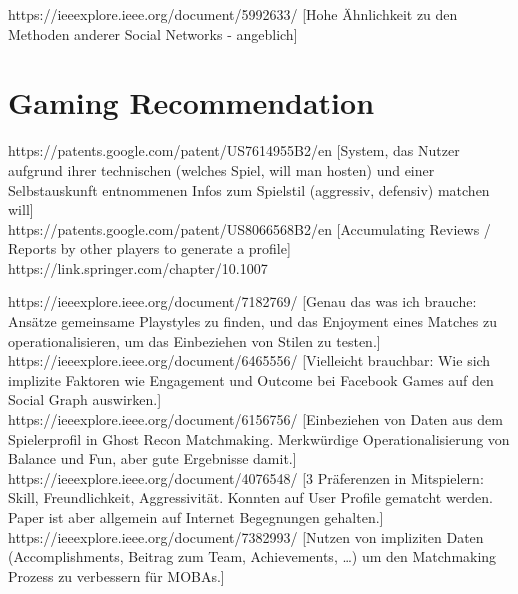 \documentclass[nochapterpage,bigchapter,linedtoc,longdoc,colorback,accentcolor=tud3b,oneside]{tudreport}
\begin{document}
https://ieeexplore.ieee.org/document/5992633/ [Hohe Ähnlichkeit zu den Methoden anderer Social Networks - angeblich]\\

\section{Gaming Recommendation}
https://patents.google.com/patent/US7614955B2/en [System, das Nutzer aufgrund ihrer technischen (welches Spiel, will man hosten) und einer Selbstauskunft entnommenen Infos zum Spielstil (aggressiv, defensiv) matchen will]\\

https://patents.google.com/patent/US8066568B2/en [Accumulating Reviews / Reports by other players to generate a profile]\\

https://link.springer.com/chapter/10.1007%

https://ieeexplore.ieee.org/document/7182769/ [Genau das was ich brauche: Ansätze gemeinsame Playstyles zu finden, und das Enjoyment eines Matches zu operationalisieren, um das Einbeziehen von Stilen zu testen.] \cite{wang2015thinking}\\

https://ieeexplore.ieee.org/document/6465556/ [Vielleicht brauchbar: Wie sich implizite Faktoren wie Engagement und Outcome bei Facebook Games auf den Social Graph auswirken.]\\

https://ieeexplore.ieee.org/document/6156756/ [Einbeziehen von Daten aus dem Spielerprofil in Ghost Recon Matchmaking. Merkwürdige Operationalisierung von Balance und Fun, aber gute Ergebnisse damit.] \cite{delalleau2012beyond}\\

https://ieeexplore.ieee.org/document/4076548/ [3 Präferenzen in Mitspielern: Skill, Freundlichkeit, Aggressivität. Konnten auf User Profile gematcht werden. Paper ist aber allgemein auf Internet Begegnungen gehalten.]\\

https://ieeexplore.ieee.org/document/7382993/ [Nutzen von impliziten Daten (Accomplishments, Beitrag zum Team, Achievements, …) um den Matchmaking Prozess zu verbessern für MOBAs.] \cite{suznjevic2015application}\\
\end{document}
